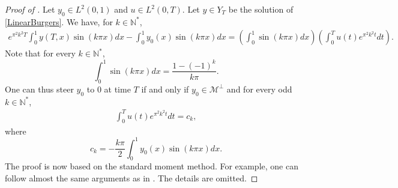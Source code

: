 \documentclass[11pt, reqno]{amsart}
\theoremstyle{plain}
\numberwithin{equation}{section}
\newcommand{\mN}{\mathbb{N}}
\begin{document}
	
\begin{proof}[Proof of ]  Let $y_0 \in L^2(0,1)$ and  $u \in L^2(0, T)$. Let $y \in Y_T$ be the solution of \eqref{LinearBurgers}. We have, for $k \in \mN^*$,
 \begin{multline*}  
    e^{ \pi^2 k^2 T} \int_0^1  y(T, x) \sin (k \pi x)  dx - \int_0^1 y_0(x) \sin (k \pi x)  dx =  \left(\int_0^1 \sin (k \pi x)  dx \right) \left(\int_0^T u(t) e^{\pi^2 k^2 t} dt \right) .
\end{multline*}
Note that for every $k \in \mN^*$,
$$
\int_0^1 \sin (k \pi x)  dx =  \frac{1 - (-1)^k}{k \pi}.
$$
One can thus steer $y_0$ to 0 at time $T$ if and only if $y_0 \in \mathscr{M}^{\bot}$ and for every odd $k \in \mN^*$,
\begin{align*}
 \int_0^T u(t) e^{\pi^2 k^2 t} dt = c_k , 
\end{align*}
where 
$$
c_k = -  \frac{k \pi}{2}  \int_0^1 y_0(x) \sin (k \pi x)  dx.  
$$
The proof is now based on the standard moment method. For example, one can follow almost the same arguments as in \cite{Tenenbaum-Tucsnak}. The details are omitted. 
\end{proof}
\end{document}
